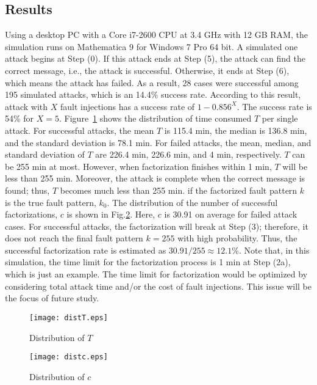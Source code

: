 \documentclass{article}
\begin{document}
\subsection{Results}
Using a desktop PC with a Core i7-2600 CPU at 3.4 GHz with 12 GB RAM, 
the simulation runs on Mathematica 9 for Windows 7 Pro 64 bit. 
A simulated one attack begins 
at Step (0). If this attack ends at Step (5), the attack can find the correct message, i.e., the 
attack is successful. Otherwise, it ends at Step (6), which means the attack has failed. 
As a result, 28 cases were successful among 195 simulated attacks, which is an 14.4\% success rate. 
According to this result, attack with $X$ fault injections has a success rate of $1-0.856^X$. 
The success rate is 54\% for $X=5$. Figure~\ref{fig:A} shows the distribution of time consumed $T$ per single attack. 
 For successful attacks, 
the mean $T$ is 115.4 min, the median is 136.8 min, and the standard deviation is 78.1 min. For 
failed attacks, the mean, median, and standard deviation of $T$ 
are 226.4 min, 226.6 min, and 4 min, respectively. $T$ can be 255 
min at most. However, when factorization finishes within 1 min, $T$ will be less than 255 min. 
Moreover, the attack is complete when the correct message is found; 
thus, $T$ becomes much less than 255 min. if the factorized fault pattern $k$ is 
the true fault pattern, $k_0$.
 The distribution of the number of successful factorizations, $c$ is shown in Fig.\ref{fig:B}. 
Here, $c$ is 30.91 
on average for failed attack cases. For successful attacks, 
the factorization will break at 
Step (3); therefore, it does not reach the final fault pattern $k=255$ with high probability. 
Thus, the successful factorization rate is estimated as $30.91/255\approx 12.1$\%.
Note that, in this simulation, the time limit for the factorization process is 
1 min at Step (2a), which is just an example. The time limit for factorization would be optimized 
by considering total attack time and/or the cost of fault injections. 
This issue will be the focus of future study.


\begin{figure}[htbp]
 \begin{center}
  \texttt{[image: distT.eps]}
 \end{center}
 \caption{Distribution of $T$}
 \label{fig:A}
\end{figure}

\begin{figure}[htbp]
 \begin{center}
  \texttt{[image: distc.eps]}
 \end{center}
 \caption{Distribution of $c$}
 \label{fig:B}
\end{figure}
\end{document}

